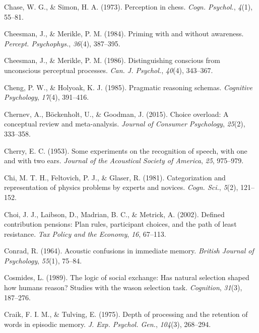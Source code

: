 \documentclass[
]{krantz}
\newlength{\cslhangindent}
\newlength{\cslentryspacingunit} %
\newenvironment{CSLReferences}[2] %
 {%
  \setlength{\parindent}{0pt}
  \ifodd #1
  \let\oldpar\par
  \def\par{\hangindent=\cslhangindent\oldpar}
  \fi
  \setlength{\parskip}{#2\cslentryspacingunit}
 }%
 {}
\begin{document}
\begin{CSLReferences}{1}{0}
\leavevmode{}%
Chase, W. G., \& Simon, H. A. (1973). Perception in chess. \emph{Cogn. Psychol.}, \emph{4}(1), 55--81.

\leavevmode{}%
Cheesman, J., \& Merikle, P. M. (1984). Priming with and without awareness. \emph{Percept. Psychophys.}, \emph{36}(4), 387--395.

\leavevmode{}%
Cheesman, J., \& Merikle, P. M. (1986). Distinguishing conscious from unconscious perceptual processes. \emph{Can. J. Psychol.}, \emph{40}(4), 343--367.

\leavevmode{}%
Cheng, P. W., \& Holyoak, K. J. (1985). Pragmatic reasoning schemas. \emph{Cognitive Psychology}, \emph{17}(4), 391--416.

\leavevmode{}%
Chernev, A., Böckenholt, U., \& Goodman, J. (2015). Choice overload: A conceptual review and meta-analysis. \emph{Journal of Consumer Psychology}, \emph{25}(2), 333--358.

\leavevmode{}%
Cherry, E. C. (1953). Some experiments on the recognition of speech, with one and with two ears. \emph{Journal of the Acoustical Society of America}, \emph{25}, 975--979.

\leavevmode{}%
Chi, M. T. H., Feltovich, P. J., \& Glaser, R. (1981). Categorization and representation of physics problems by experts and novices. \emph{Cogn. Sci.}, \emph{5}(2), 121--152.

\leavevmode{}%
Choi, J. J., Laibson, D., Madrian, B. C., \& Metrick, A. (2002). Defined contribution pensions: Plan rules, participant choices, and the path of least resistance. \emph{Tax Policy and the Economy}, \emph{16}, 67--113.

\leavevmode{}%
Conrad, R. (1964). Acoustic confusions in immediate memory. \emph{British Journal of Psychology}, \emph{55}(1), 75--84.

\leavevmode{}%
Cosmides, L. (1989). The logic of social exchange: Has natural selection shaped how humans reason? Studies with the wason selection task. \emph{Cognition}, \emph{31}(3), 187--276.

\leavevmode{}%
Craik, F. I. M., \& Tulving, E. (1975). Depth of processing and the retention of words in episodic memory. \emph{J. Exp. Psychol. Gen.}, \emph{104}(3), 268--294.


\end{CSLReferences}
\end{document}
